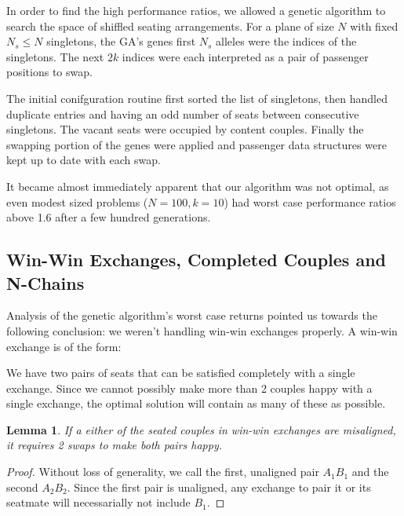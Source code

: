 \documentclass[a4paper]{article}
\newtheorem{lem}{Lemma}[section]
\begin{document}
In order to find the high performance ratios, we allowed a genetic algorithm to search the space of shiffled seating arrangements.  For a plane of size $N$ with fixed $N_s \leq N$ singletons, the GA's genes first $N_s$ alleles were the indices of the singletons.  The next $2k$ indices were each interpreted as a pair of passenger positions to swap.  

The initial conifguration routine first sorted the list of singletons, then handled duplicate entries and having an odd number of seats between consecutive singletons. The vacant seats were occupied by content couples.  Finally the swapping portion of the genes were applied and passenger data structures were kept up to date with each swap.

It became almost immediately apparent that our algorithm was not optimal, as even modest sized problems ($N = 100, k = 10$) had worst case performance ratios above 1.6 after a few hundred generations.

\subsection{Win-Win Exchanges, Completed Couples and N-Chains}

Analysis of the genetic algorithm's worst case returns pointed us towards the following conclusion: we weren't handling win-win exchanges properly.  A win-win exchange is of the form:

\begin{figure}[H]
\centering
{}
\end{figure}

We have two pairs of seats that can be satisfied completely with a single exchange. Since we cannot possibly make more than 2 couples happy with a single exchange, the optimal solution will contain as many of these as possible.  

\begin{lem} 
If a either of the seated couples in win-win exchanges are misaligned, it requires 2 swaps to make both pairs happy.
\end{lem}

\begin{proof}
Without loss of generality, we call the first, unaligned pair $A_1B_1$ and the second $A_2B_2$.  Since the first pair is unaligned, any exchange to pair it or its seatmate will necessarially not include $B_1$.  
\end{proof}
\end{document}
